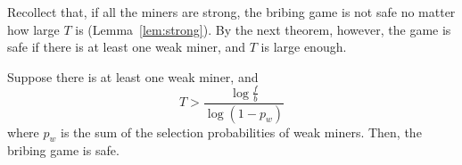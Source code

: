 Recollect that, if all the miners are strong, the bribing game is not safe no matter how large $T$ is (Lemma~\ref{lem:strong}). By the next theorem, however, the game is safe if there is at least one weak miner, and $T$ is large enough.

%

\begin{theorem}
\label{thm:largeT}
  Suppose there is at least one weak miner, and
  \begin{equation}
  \label{equ:minT}
  T> \frac{\log \frac{f}{b}}{\log (1-p_w)}
  \end{equation}
   where $p_w$ is the sum of the selection probabilities of weak miners. Then, the bribing game is safe. 
\end{theorem}
